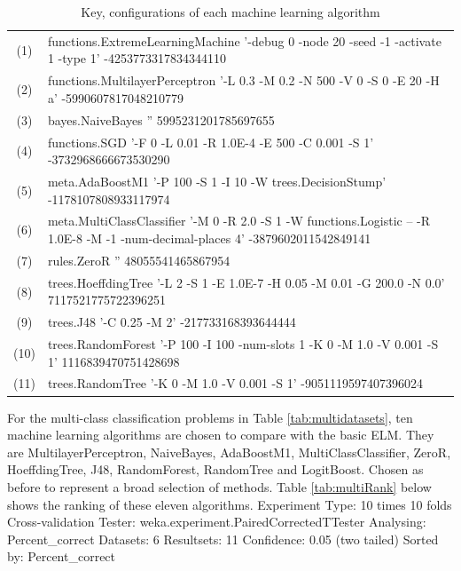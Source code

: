 \documentclass[a4paper, 14pt]{extarticle}
\begin{document}
\begin{landscape}
\begin{table}[thb]
\caption{\label{tab:emlbaseKeys}Key, configurations of each machine learning algorithm}
\scriptsize
{\centering
\begin{tabular}{cl}\\
(1) & functions.ExtremeLearningMachine '-debug 0 -node 20 -seed -1 -activate 1 -type 1' -4253773317834344110 \\
(2) & functions.MultilayerPerceptron '-L 0.3 -M 0.2 -N 500 -V 0 -S 0 -E 20 -H a' -5990607817048210779 \\
(3) & bayes.NaiveBayes '' 5995231201785697655 \\
(4) & functions.SGD '-F 0 -L 0.01 -R 1.0E-4 -E 500 -C 0.001 -S 1' -3732968666673530290 \\
(5) & meta.AdaBoostM1 '-P 100 -S 1 -I 10 -W trees.DecisionStump' -1178107808933117974 \\
(6) & meta.MultiClassClassifier '-M 0 -R 2.0 -S 1 -W functions.Logistic -- -R 1.0E-8 -M -1 -num-decimal-places 4' -3879602011542849141 \\
(7) & rules.ZeroR '' 48055541465867954 \\
(8) & trees.HoeffdingTree '-L 2 -S 1 -E 1.0E-7 -H 0.05 -M 0.01 -G 200.0 -N 0.0' 7117521775722396251 \\
(9) & trees.J48 '-C 0.25 -M 2' -217733168393644444 \\
(10) & trees.RandomForest '-P 100 -I 100 -num-slots 1 -K 0 -M 1.0 -V 0.001 -S 1' 1116839470751428698 \\
(11) & trees.RandomTree '-K 0 -M 1.0 -V 0.001 -S 1' -9051119597407396024 \\
\end{tabular}
}
\end{table}
\end{landscape}
\par For the multi-class classification problems in Table \ref{tab:multidatasets}, ten machine learning algorithms are chosen to compare with the basic ELM. They are MultilayerPerceptron, NaiveBayes, AdaBoostM1, MultiClassClassifier, ZeroR, HoeffdingTree, J48, RandomForest, RandomTree and LogitBoost. Chosen as before to represent a broad selection of methods. Table \ref{tab:multiRank} below shows the ranking of these eleven algorithms.
\newline\newline
Experiment Type: 10 times 10 folds Cross-validation \newline
Tester:     weka.experiment.PairedCorrectedTTester \newline
Analysing:  Percent\_correct \newline
Datasets:   6 \newline
Resultsets: 11 \newline
Confidence: 0.05 (two tailed) \newline
Sorted by:  Percent\_correct
\end{document}
